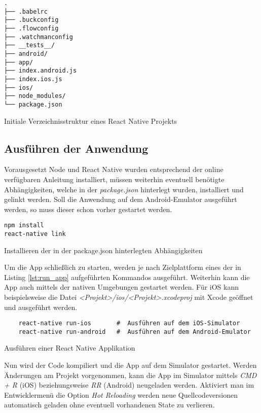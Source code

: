         
\begin{lstlisting}[style=tree]
.
├── .babelrc
├── .buckconfig
├── .flowconfig
├── .watchmanconfig
├── __tests__/
├── android/
├── app/
├── index.android.js
├── index.ios.js
├── ios/
├── node_modules/
└── package.json
    \end{lstlisting}
\vspace{-0.5 cm}
\begin{listing}[H]
    \caption{Initiale Verzeichnisstruktur eines React Native Projekts}
    \label{lst:idirectory_structure}
\end{listing}




\subsection{Ausführen der Anwendung}
Vorausgesetzt Node und React Native wurden entsprechend der online verfügbaren Anleitung installiert, müssen weiterhin eventuell benötigte Abhängigkeiten, welche in der \textit{package.json} hinterlegt wurden, installiert und gelinkt werden. Soll die Anwendung auf dem Android-Emulator ausgeführt werden, so muss dieser schon vorher gestartet werden.
\begin{listing}[H]
    \begin{verbatim}
npm install
react-native link
    \end{verbatim}
    \caption{Installieren der in der package.json hinterlegten Abhängigkeiten}
    \label{lst:install_dependencies}
\end{listing}

Um die App schließlich zu starten, werden je nach Zielplattform eines der in Listing \ref{lst:run_app} aufgeführten Kommandos ausgeführt. Weiterhin kann die App auch mittels der nativen Umgebungen gestartet werden. Für iOS kann beispielsweise die Datei \textit{<Projekt>/ios/<Projekt>.xcodeproj} mit Xcode geöffnet und ausgeführt werden.
\begin{listing}[H]
    \begin{verbatim}
    react-native run-ios       #  Ausführen auf dem iOS-Simulator
    react-native run-android   #  Ausführen auf dem Android-Emulator
    \end{verbatim}
    \caption{Ausführen einer React Native Applikation}
    \label{lst:run_app}
\end{listing}
Nun wird der Code kompiliert und die App auf dem Simulator gestartet. Werden Änderungen am Projekt vorgenommen, kann die App im Simulator mittels \textit{CMD + R} (iOS) beziehungsweise \textit{RR} (Android) neugeladen werden. Aktiviert man im Entwicklermenü die Option \textit{Hot Reloading} werden neue Quellcodeversionen automatisch geladen ohne eventuell vorhandenen State zu verlieren.


